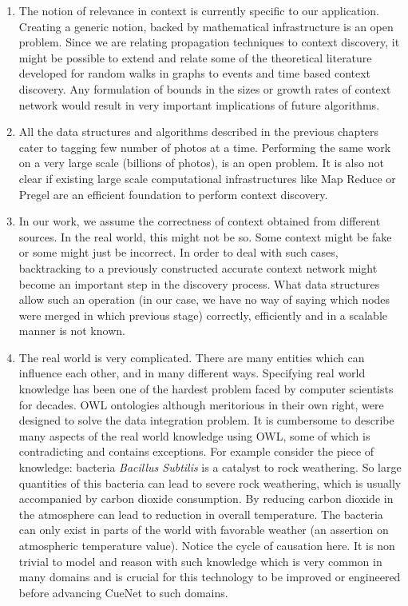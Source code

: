 \begin{enumerate}
  \item The notion of relevance in context is currently specific to our application. Creating a generic notion, backed by mathematical infrastructure is an open problem. Since we are relating propagation techniques to context discovery, it might be possible to extend and relate some of the theoretical literature developed for random walks in graphs to events and time based context discovery. Any formulation of bounds in the sizes or growth rates of context network would result in very important implications of future algorithms.

  \item All the data structures and algorithms described in the previous chapters cater to tagging few number of photos at a time. Performing the same work on a very large scale (billions of photos), is an open problem. It is also not clear if existing large scale computational infrastructures like Map Reduce or Pregel are an efficient foundation to perform context discovery.

  \item In our work, we assume the correctness of context obtained from different sources. In the real world, this might not be so. Some context might be fake or some might just be incorrect. In order to deal with such cases, backtracking to a previously constructed accurate context network might become an important step in the discovery process. What data structures allow such an operation (in our case, we have no way of saying which nodes were merged in which previous stage) correctly, efficiently and in a scalable manner is not known.

  \item The real world is very complicated. There are many entities which can influence each other, and in many different ways. Specifying real world knowledge has been one of the hardest problem faced by computer scientists for decades. OWL ontologies although meritorious in their own right, were designed to solve the data integration problem. It is cumbersome to describe many aspects of the real world knowledge using OWL, some of which is contradicting and contains exceptions. For example consider the piece of knowledge: bacteria \textit{Bacillus Subtilis} is a catalyst to rock weathering. So large quantities of this bacteria can lead to severe rock weathering, which is usually accompanied by carbon dioxide consumption. By reducing carbon dioxide in the atmosphere can lead to reduction in overall temperature. The bacteria can only exist in parts of the world with favorable weather (an assertion on atmospheric temperature value). Notice the cycle of causation here. It is non trivial to model and reason with such knowledge which is very common in many domains and is crucial for this technology to be improved or engineered before advancing CueNet to such domains.

\end{enumerate}

